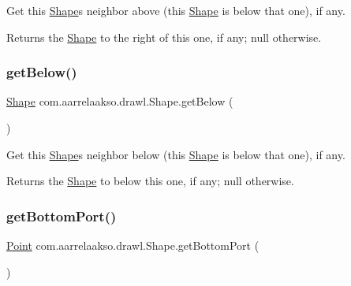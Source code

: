 Get this \hyperlink{classcom_1_1aarrelaakso_1_1drawl_1_1_shape}{Shape}\textquotesingle{}s neighbor above (this \hyperlink{classcom_1_1aarrelaakso_1_1drawl_1_1_shape}{Shape} is below that one), if any. 

\begin{DoxyReturn}{Returns}
the \hyperlink{classcom_1_1aarrelaakso_1_1drawl_1_1_shape}{Shape} to the right of this one, if any; {\ttfamily null} otherwise. 
\end{DoxyReturn}
\mbox{\label{classcom_1_1aarrelaakso_1_1drawl_1_1_shape_a53de5ab609d879719cd3b372dfe8df58}} 
\subsubsection{\texorpdfstring{get\+Below()}{getBelow()}}
{\footnotesize\ttfamily \hyperlink{classcom_1_1aarrelaakso_1_1drawl_1_1_shape}{Shape} com.\+aarrelaakso.\+drawl.\+Shape.\+get\+Below (\begin{DoxyParamCaption}{ }\end{DoxyParamCaption})\hspace{0.3cm}{\ttfamily [inherited]}}



Get this \hyperlink{classcom_1_1aarrelaakso_1_1drawl_1_1_shape}{Shape}\textquotesingle{}s neighbor below (this \hyperlink{classcom_1_1aarrelaakso_1_1drawl_1_1_shape}{Shape} is below that one), if any. 

\begin{DoxyReturn}{Returns}
the \hyperlink{classcom_1_1aarrelaakso_1_1drawl_1_1_shape}{Shape} to below this one, if any; {\ttfamily null} otherwise. 
\end{DoxyReturn}
\mbox{\label{classcom_1_1aarrelaakso_1_1drawl_1_1_shape_aba14efe9a16c0808580963c66b171082}} 
\subsubsection{\texorpdfstring{get\+Bottom\+Port()}{getBottomPort()}}
{\footnotesize\ttfamily \hyperlink{classcom_1_1aarrelaakso_1_1drawl_1_1_point}{Point} com.\+aarrelaakso.\+drawl.\+Shape.\+get\+Bottom\+Port (\begin{DoxyParamCaption}{ }\end{DoxyParamCaption})\hspace{0.3cm}{\ttfamily [inherited]}}



